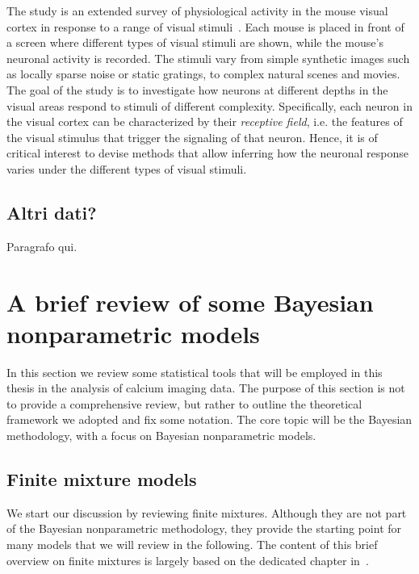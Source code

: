The study is an extended survey of physiological activity in the mouse visual cortex in response to a range of visual stimuli~\citep{allen_stimulus}. Each mouse is placed in front of a screen where different types of visual stimuli are shown, while the mouse’s neuronal activity is recorded. The stimuli vary from simple synthetic images such as locally sparse noise or static gratings, to complex natural scenes and movies.
The goal of the study is to investigate how neurons at different depths in the visual areas respond to stimuli of different complexity. Specifically, each neuron in the visual cortex can be characterized by their \textit{receptive field}, i.e. the features of the visual stimulus that trigger the signaling of that neuron. Hence, it is of critical interest to devise methods that allow inferring how the neuronal response varies under the different types of visual stimuli. %


\subsection{Altri dati?}
Paragrafo qui.

\section{A brief review of some Bayesian nonparametric models} 
In this section we review some statistical tools that will be employed in this thesis in the analysis of calcium imaging data. The purpose of this section is not to provide a comprehensive review, but rather to outline the theoretical framework we adopted and fix some notation.
The core topic will be the Bayesian methodology, with a focus on Bayesian nonparametric models.

\subsection{Finite mixture models}
\label{subsec:finite_mix}
We start our discussion by reviewing finite mixtures. Although they are not part of the Bayesian nonparametric methodology, they provide the starting point for many models that we will review in the following. The content of this brief overview on finite mixtures is largely based on the dedicated chapter in~\citet{gelman2013}.

